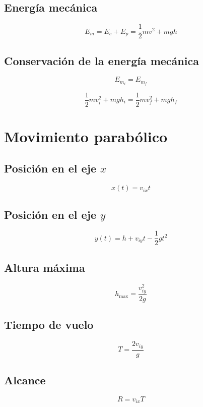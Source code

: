 \documentclass[a4paper,12pt]{article}
\begin{document}
\subsection{Energía mecánica}

\begin{equation*}
    E_m = E_c + E_p = \frac{1}{2} m v^2 + m g h
\end{equation*}

\subsection{Conservación de la energía mecánica}

\begin{equation*}
    E_{m_i} = E_{m_f}
\end{equation*}

\begin{equation*}
    \frac{1}{2} m v_i^2 + m g h_i = \frac{1}{2} m v_f^2 + m g h_f
\end{equation*}

\section{Movimiento parabólico}

\subsection{Posición en el eje $x$}

\begin{equation*}
    x(t) = v_{ix} t
\end{equation*}

\subsection{Posición en el eje $y$}

\begin{equation*}
    y(t) = h + v_{iy} t - \frac{1}{2} g t^2
\end{equation*}

\subsection{Altura máxima}

\begin{equation*}
    h_{\text{max}} = \frac{v_{iy}^2}{2 g}
\end{equation*}

\subsection{Tiempo de vuelo}

\begin{equation*}
    T = \frac{2 v_{iy}}{g}
\end{equation*}

\subsection{Alcance}

\begin{equation*}
    R = v_{ix} T
\end{equation*}
\end{document}
